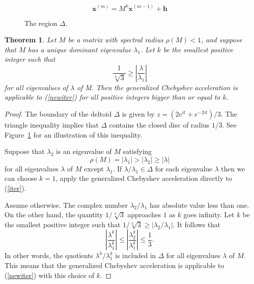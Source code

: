 \documentclass[10pt,a4paper]{amsart}
\newtheorem{theorem}{Theorem}
\newcommand{\mb}{\mathbf}
\begin{document}
\begin{equation}\label{newiter}
	\mb{x}^{(m)}=M^k\mb{x}^{(m-1)}+\mb{h}
\end{equation}

\begin{figure}[htbp]
	\centering
	
	\caption{The region $\Delta$.}
	\label{fig:deltoid}
\end{figure}	

\begin{theorem}\label{existingk}
Let $M$ be a matrix with spectral radius $\rho(M)<1$, and suppose that $M$ has a unique dominant eigenvalue $\lambda_1$. Let $k$ be the smallest positive integer such that $$\frac{1}{\sqrt[k]{3}} \geq \left|\frac{\lambda}{\lambda_1}\right|$$ for all eigenvalues of $\lambda$ of M. Then the generalized Chebyshev acceleration is applicable to (\ref{newiter}) for all positive integers bigger than or equal to $k$.
\end{theorem}

\begin{proof}
The boundary of the deltoid $\Delta$ is given by $z=(2e^{it}+e^{-2it})/3$. The triangle inequality implies that $\Delta$ contains the closed disc of radius $1/3$. See Figure~\ref{fig:deltoid} for an illustration of this inequality. 

Suppose that $\lambda_2$  is an eigenvalue of $M$ satisfying
\[\rho(M) = |\lambda_1| > |\lambda_2| \geq |\lambda|	\]
for all eigenvalues $\lambda$ of $M$ except $\lambda_1$. If $\lambda/\lambda_1 \in \Delta$ for each eigenvalue $\lambda$ then we can choose $k=1$, apply the generalized Chebyshev acceleration directly to (\ref{iter}).

Assume otherwise. The complex number $\lambda_2/\lambda_1$ has absolute value less than one. On the other hand, the quantity $1/\sqrt[k]{3}$ approaches $1$ as $k$ goes infinity. Let $k$ be the smallest positive integer such that  $1/\sqrt[k]{3} \geq |\lambda_2/\lambda_1|$. It follows that  
$$ \left|\frac{\lambda^k}{\lambda_1^k}\right| \leq \left|\frac{\lambda_2^k}{\lambda_1^k}\right| \leq \frac{1}{3}.$$
In other words, the quotients $\lambda^k/\lambda_1^k$ is included in $\Delta$ for all eigenvalues $\lambda$ of $M$. This means that the generalized Chebyshev acceleration is applicable to (\ref{newiter}) with this choice of $k$.
\end{proof}
\end{document}
